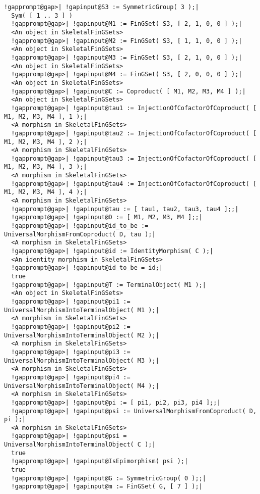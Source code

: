 \documentclass[a4paper,11pt]{report}
\begin{document}
{{{\begin{Verbatim}[commandchars=!@|,fontsize=\small,frame=single,label=Example]
  !gapprompt@gap>| !gapinput@S3 := SymmetricGroup( 3 );|
  Sym( [ 1 .. 3 ] )
  !gapprompt@gap>| !gapinput@M1 := FinGSet( S3, [ 2, 1, 0, 0 ] );|
  <An object in SkeletalFinGSets>
  !gapprompt@gap>| !gapinput@M2 := FinGSet( S3, [ 1, 1, 0, 0 ] );|
  <An object in SkeletalFinGSets>
  !gapprompt@gap>| !gapinput@M3 := FinGSet( S3, [ 2, 1, 0, 0 ] );|
  <An object in SkeletalFinGSets>
  !gapprompt@gap>| !gapinput@M4 := FinGSet( S3, [ 2, 0, 0, 0 ] );|
  <An object in SkeletalFinGSets>
  !gapprompt@gap>| !gapinput@C := Coproduct( [ M1, M2, M3, M4 ] );|
  <An object in SkeletalFinGSets>
  !gapprompt@gap>| !gapinput@tau1 := InjectionOfCofactorOfCoproduct( [ M1, M2, M3, M4 ], 1 );|
  <A morphism in SkeletalFinGSets>
  !gapprompt@gap>| !gapinput@tau2 := InjectionOfCofactorOfCoproduct( [ M1, M2, M3, M4 ], 2 );|
  <A morphism in SkeletalFinGSets>
  !gapprompt@gap>| !gapinput@tau3 := InjectionOfCofactorOfCoproduct( [ M1, M2, M3, M4 ], 3 );|
  <A morphism in SkeletalFinGSets>
  !gapprompt@gap>| !gapinput@tau4 := InjectionOfCofactorOfCoproduct( [ M1, M2, M3, M4 ], 4 );|
  <A morphism in SkeletalFinGSets>
  !gapprompt@gap>| !gapinput@tau := [ tau1, tau2, tau3, tau4 ];;|
  !gapprompt@gap>| !gapinput@D := [ M1, M2, M3, M4 ];;|
  !gapprompt@gap>| !gapinput@id_to_be := UniversalMorphismFromCoproduct( D, tau );|
  <A morphism in SkeletalFinGSets>
  !gapprompt@gap>| !gapinput@id := IdentityMorphism( C );|
  <An identity morphism in SkeletalFinGSets>
  !gapprompt@gap>| !gapinput@id_to_be = id;|
  true
  !gapprompt@gap>| !gapinput@T := TerminalObject( M1 );|
  <An object in SkeletalFinGSets>
  !gapprompt@gap>| !gapinput@pi1 := UniversalMorphismIntoTerminalObject( M1 );|
  <A morphism in SkeletalFinGSets>
  !gapprompt@gap>| !gapinput@pi2 := UniversalMorphismIntoTerminalObject( M2 );|
  <A morphism in SkeletalFinGSets>
  !gapprompt@gap>| !gapinput@pi3 := UniversalMorphismIntoTerminalObject( M3 );|
  <A morphism in SkeletalFinGSets>
  !gapprompt@gap>| !gapinput@pi4 := UniversalMorphismIntoTerminalObject( M4 );|
  <A morphism in SkeletalFinGSets>
  !gapprompt@gap>| !gapinput@pi := [ pi1, pi2, pi3, pi4 ];;|
  !gapprompt@gap>| !gapinput@psi := UniversalMorphismFromCoproduct( D, pi );|
  <A morphism in SkeletalFinGSets>
  !gapprompt@gap>| !gapinput@psi = UniversalMorphismIntoTerminalObject( C );|
  true
  !gapprompt@gap>| !gapinput@IsEpimorphism( psi );|
  true
  !gapprompt@gap>| !gapinput@G := SymmetricGroup( 0 );;|
  !gapprompt@gap>| !gapinput@m := FinGSet( G, [ 7 ] );|

\end{Verbatim}}}}
\end{document}
